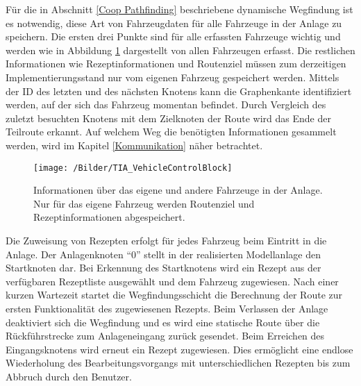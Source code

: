 			Für die in Abschnitt \ref{Coop Pathfinding} beschriebene dynamische Wegfindung ist es notwendig, diese Art von Fahrzeugdaten für alle Fahrzeuge in der Anlage zu speichern. Die ersten drei Punkte sind für alle erfassten Fahrzeuge wichtig und werden wie in Abbildung \ref{VehicleControlBlock} dargestellt von allen Fahrzeugen erfasst. Die restlichen Informationen wie Rezeptinformationen und Routenziel müssen zum derzeitigen Implementierungsstand nur vom eigenen Fahrzeug gespeichert werden. Mittels der ID des letzten und des nächsten Knotens kann die Graphenkante identifiziert werden, auf der sich das Fahrzeug momentan befindet. Durch Vergleich des zuletzt besuchten Knotens mit dem Zielknoten der Route wird das Ende der Teilroute erkannt. Auf welchem Weg die benötigten Informationen gesammelt werden, wird im  Kapitel \ref{Kommunikation} näher betrachtet.
			
			\begin{figure}[h]
				\centering
				\texttt{[image: /Bilder/TIA\_VehicleControlBlock]}
				\vspace{0.2cm}
				\caption{Informationen über das eigene und andere Fahrzeuge in der Anlage. Nur für das eigene Fahrzeug werden Routenziel und Rezeptinformationen abgespeichert.}\label{VehicleControlBlock}
			\end{figure}
			Die Zuweisung von Rezepten erfolgt für jedes Fahrzeug beim Eintritt in die Anlage. Der Anlagenknoten "`0"' stellt in der realisierten Modellanlage den Startknoten dar. Bei Erkennung des Startknotens wird ein Rezept aus der verfügbaren Rezeptliste ausgewählt und dem Fahrzeug zugewiesen. Nach einer kurzen Wartezeit startet die Wegfindungsschicht die Berechnung der Route zur ersten Funktionalität des zugewiesenen Rezepts. Beim Verlassen der Anlage deaktiviert sich die Wegfindung und es wird eine statische Route über die Rückführstrecke zum Anlageneingang zurück gesendet. Beim Erreichen des Eingangsknotens wird erneut ein Rezept zugewiesen. Dies ermöglicht eine endlose Wiederholung des Bearbeitungsvorgangs  mit unterschiedlichen Rezepten bis zum Abbruch durch den Benutzer.
			
		
